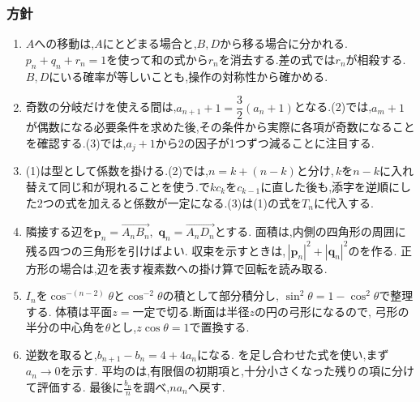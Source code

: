       \subsubsection{方針}\label{節：発展難易度：方針}\label{節：大学過去問ベースのもの：方針}
        \begin{enumerate}[label=\textbf{問\arabic*.},leftmargin=3.8em,format=\bookitemlink{practice-entrance}{hint}{problem}]
          \item $A$への移動は,$A$にとどまる場合と,$B,D$から移る場合に分かれる.$p_n+q_n+r_n=1$を使って和の式から$r_n$を消去する.差の式では$r_n$が相殺する.$B,D$にいる確率が等しいことも,操作の対称性から確かめる.
          \item 奇数の分岐だけを使える間は,$a_{n+1}+1=\dfrac32(a_n+1)$となる.(2)では,$a_m+1$が偶数になる必要条件を求めた後,その条件から実際に各項が奇数になることを確認する.(3)では,$a_j+1$から2の因子が1つずつ減ることに注目する.
          \item (1)は型として係数を掛ける.(2)では,$n=k+(n-k)$と分け,\,$k$を$n-k$に入れ替えて同じ和が現れることを使う.で$kc_k$を$c_{k-1}$に直した後も,添字を逆順にした2つの式を加えると係数が一定になる.(3)は(1)の式を$T_n$に代入する.
          \item 隣接する辺を$\boldsymbol p_n=\overrightarrow{A_nB_n}$,
                \,$\boldsymbol q_n=\overrightarrow{A_nD_n}$とする.
                面積は,内側の四角形の周囲に残る四つの三角形を引けばよい.
                収束を示すときは,\,$|\boldsymbol p_n|^2+|\boldsymbol q_n|^2$のを作る.
                正方形の場合は,辺を表す複素数への掛け算で回転を読み取る.
          \item $I_n$を$\cos^{-(n-2)}\theta$と$\cos^{-2}\theta$の積として部分積分し,
                $\sin^2\theta=1-\cos^2\theta$で整理する.
                体積は平面$z=$一定で切る.断面は半径$z$の円の弓形になるので,
                弓形の半分の中心角を$\theta$とし,$z\cos\theta=1$で置換する.
          \item 逆数を取ると,$b_{n+1}-b_n=4+4a_n$になる.
                を足し合わせた式を使い,まず$a_n\to0$を示す.
                平均のは,有限個の初期項と,十分小さくなった残りの項に分けて評価する.
                最後に$\displaystyle \frac{b_n}{n}$を調べ,$na_n$へ戻す.

\end{enumerate}
